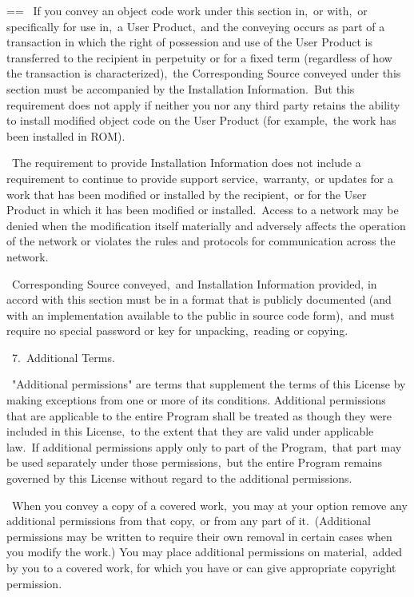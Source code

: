 \documentclass{book}
\makeatletter
\newenvironment{Texinfopreformatted}{%
  \par\GNUTobeylines\obeyspaces\frenchspacing\parskip=\z@\parindent=\z@}{}
{\catcode`\^^M=13 \gdef\GNUTobeylines{\catcode`\^^M=13 \def^^M{\null\par}}}
\newenvironment{Texinfoindented}{\begin{list}{}{}\item\relax}{\end{list}}
\renewcommand{\_}{\Texinfounderscore\discretionary{}{}{}}
\makeatother
\begin{document}
\begin{Texinfoindented}
\begin{Texinfopreformatted}
\  If you convey an object code work under this section in,\ or with,\ or
specifically for use in,\ a User Product,\ and the conveying occurs as
part of a transaction in which the right of possession and use of the
User Product is transferred to the recipient in perpetuity or for a
fixed term (regardless of how the transaction is characterized),\ the
Corresponding Source conveyed under this section must be accompanied
by the Installation Information.\  But this requirement does not apply
if neither you nor any third party retains the ability to install
modified object code on the User Product (for example,\ the work has
been installed in ROM).

\  The requirement to provide Installation Information does not include a
requirement to continue to provide support service,\ warranty,\ or updates
for a work that has been modified or installed by the recipient,\ or for
the User Product in which it has been modified or installed.\  Access to a
network may be denied when the modification itself materially and
adversely affects the operation of the network or violates the rules and
protocols for communication across the network.

\  Corresponding Source conveyed,\ and Installation Information provided,
in accord with this section must be in a format that is publicly
documented (and with an implementation available to the public in
source code form),\ and must require no special password or key for
unpacking,\ reading or copying.

\  7.\ Additional Terms.

\  "Additional permissions" are terms that supplement the terms of this
License by making exceptions from one or more of its conditions.
Additional permissions that are applicable to the entire Program shall
be treated as though they were included in this License,\ to the extent
that they are valid under applicable law.\  If additional permissions
apply only to part of the Program,\ that part may be used separately
under those permissions,\ but the entire Program remains governed by
this License without regard to the additional permissions.

\  When you convey a copy of a covered work,\ you may at your option
remove any additional permissions from that copy,\ or from any part of
it.\  (Additional permissions may be written to require their own
removal in certain cases when you modify the work.)  You may place
additional permissions on material,\ added by you to a covered work,
for which you have or can give appropriate copyright permission.


\end{Texinfopreformatted}
\end{Texinfoindented}
\end{document}
